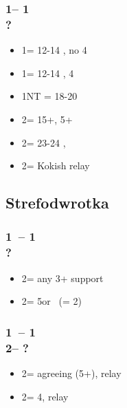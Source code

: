 \documentclass[12pt, a4paper]{report}
\begin{document}
\begin{bidpage}
\subsubsection*{1\clubs -- 1\diams\\
                ?}
\begin{itemize}
    \item 1\hearts = 12-14 \bal, no 4\spades
    \item 1\spades = 12-14 \bal, 4\spades
    \item 1NT = 18-20 \bal
    \item 2\clubs = 15+, 5+\clubs
    \item 2\nt = 23-24 \bal, \nf
    \item 2\hearts = Kokish relay
\end{itemize}
\end{bidpage}

\begin{bidpage}
\section{Strefodwrotka}

\subsubsection*{1\clubs\ -- 1\major\\
                ?}
\begin{itemize}
    \item 2\diams = any 3+ support \gf
    \item 2\nt = 5\diams or \bal\ \gf (= 2\hearts)
\end{itemize}
\end{bidpage}

\begin{bidpage}
\subsubsection*{1\clubs\ -- 1\major\\
                2\diams -- ?}
\begin{itemize}
    \item 2\hearts = agreeing \major (5+), relay
    \item 2\spades = 4\major, relay
\end{itemize}
\end{bidpage}
\end{document}
